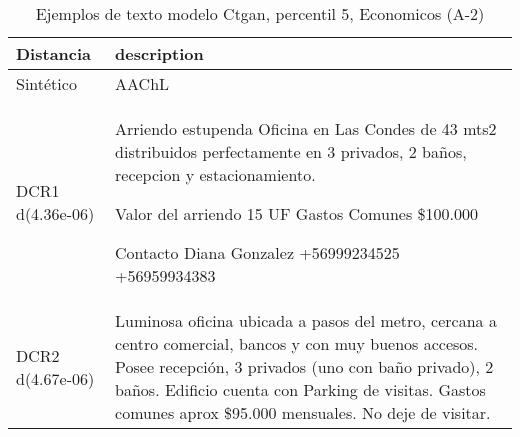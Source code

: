 \begin{table}[H]
\centering
\fontsize{10}{14}\selectfont
\caption{Ejemplos de texto modelo Ctgan, percentil 5, Economicos (A-2)}
\label{table-example-economicos-a-2-ctgan-5p-text}
\begin{tabular}{|l|m{35em}|}
\hline
\rowcolor[gray]{0.8}
Distancia & description \\
\hline Sintético & AAChL \\
\hline DCR1 d(4.36e-06) & Arriendo estupenda Oficina en Las Condes de 43 mts2 distribuidos perfectamente en 3 privados, 2 ba\~nos, recepcion y estacionamiento. 

Valor del arriendo 15 UF
Gastos Comunes \$100.000

Contacto 
Diana Gonzalez
+56999234525
+56959934383 \\
\hline DCR2 d(4.67e-06) & Luminosa oficina ubicada a pasos del metro, cercana a centro comercial, bancos y con muy buenos accesos. Posee recepci\'on, 3 privados (uno con ba\~no privado), 2 ba\~nos. Edificio cuenta con Parking de visitas. Gastos comunes aprox \$95.000 mensuales. No deje de visitar. \\
\hline
\end{tabular}
\end{table}
